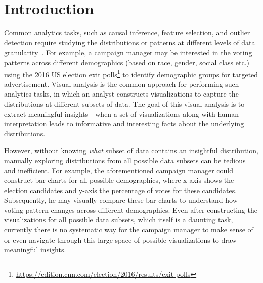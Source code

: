 \section{Introduction}
\par Common analytics tasks, such as causal inference, feature selection, and outlier detection require studying the distributions or patterns at different levels of data granularity~\cite{Anand2015,Wu2013,Heer2012}. For example, a campaign manager may be interested in the voting patterns across different demographics (based on race, gender, social class etc.) using the 2016 US election exit polls\footnote{\url{https://edition.cnn.com/election/2016/results/exit-polls}} to identify demographic groups for targeted advertisement. Visual analysis is the common approach for performing such analytics tasks, in which an analyst constructs visualizations to capture the distributions at different subsets of data. The goal of this visual analysis is to extract meaningful insights---when a set of visualizations along with human interpretation leads to informative and interesting facts about the underlying distributions.

\par However, without knowing \textit{what} subset of data contains an insightful distribution, manually exploring distributions from all possible data subsets can be tedious and inefficient. For example, the aforementioned campaign manager could construct bar charts for all possible demographics, where x-axis shows the election candidates and y-axis the percentage of votes for these candidates. Subsequently, he may visually compare these bar charts to understand how voting pattern changes across different demographics. Even after constructing the visualizations for all possible data subsets, which itself is a daunting task, currently there is no systematic way for the campaign manager to make sense of or even navigate through this large space of possible visualizations to draw meaningful insights. %

